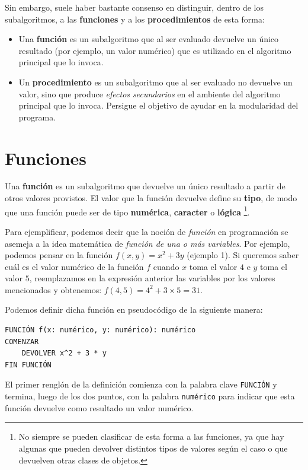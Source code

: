 \documentclass[
]{book}
\providecommand{\tightlist}{%
  \setlength{\itemsep}{0pt}\setlength{\parskip}{0pt}}
\begin{document}
Sin embargo, suele haber bastante consenso en distinguir, dentro de los subalgoritmos, a las \textbf{funciones} y a los \textbf{procedimientos} de esta forma:

\begin{itemize}
\tightlist
\item
  Una \textbf{función} es un subalgoritmo que al ser evaluado devuelve un único resultado (por ejemplo, un valor numérico) que es utilizado en el algoritmo principal que lo invoca.
\item
  Un \textbf{procedimiento} es un subalgoritmo que al ser evaluado no devuelve un valor, sino que produce \emph{efectos secundarios} en el ambiente del algoritmo principal que lo invoca. Persigue el objetivo de ayudar en la modularidad del programa.
\end{itemize}

\hypertarget{funciones}{%
\section{Funciones}\label{funciones}}

Una \textbf{función} es un subalgoritmo que devuelve un único resultado a partir de otros valores provistos. El valor que la función devuelve define su \textbf{tipo}, de modo que una función puede ser de tipo \textbf{numérica}, \textbf{caracter} o \textbf{lógica} \footnote{No siempre se pueden clasificar de esta forma a las funciones, ya que hay algunas que pueden devolver distintos tipos de valores según el caso o que devuelven otras clases de objetos.}.

Para ejemplificar, podemos decir que la noción de \emph{función} en programación se asemeja a la idea matemática de \emph{función de una o más variables}. Por ejemplo, podemos pensar en la función \(f(x, y) = x^2 + 3y\) (ejemplo 1). Si queremos saber cuál es el valor numérico de la función \(f\) cuando \(x\) toma el valor \(4\) e \(y\) toma el valor \(5\), reemplazamos en la expresión anterior las variables por los valores mencionados y obtenemos: \(f(4, 5) = 4^2 + 3 \times 5 = 31\).

Podemos definir dicha función en pseudocódigo de la siguiente manera:

\begin{verbatim}
FUNCIÓN f(x: numérico, y: numérico): numérico
COMENZAR
    DEVOLVER x^2 + 3 * y
FIN FUNCIÓN
\end{verbatim}

El primer renglón de la definición comienza con la palabra clave \texttt{FUNCIÓN} y termina, luego de los dos puntos, con la palabra \texttt{numérico} para indicar que esta función devuelve como resultado un valor numérico.
\end{document}

